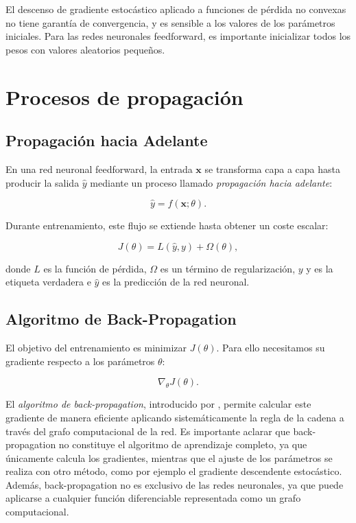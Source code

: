 El descenso de gradiente estocástico aplicado a funciones de pérdida no convexas no tiene garantía de convergencia, y es sensible a los valores de los parámetros iniciales. Para las redes neuronales feedforward, es importante inicializar todos los pesos con valores aleatorios pequeños.


\section{Procesos de propagación}

\subsection{Propagación hacia Adelante}

En una red neuronal feedforward, la entrada $\mathbf{x}$ se transforma capa a capa hasta producir la salida $\hat{y}$ mediante un proceso llamado \emph{propagación hacia adelante}:

\[
\hat{y} = f(\mathbf{x}; \theta).
\]

Durante entrenamiento, este flujo se extiende hasta obtener un coste escalar:

\[
J(\theta) = L(\hat{y}, y) + \Omega(\theta),
\]

donde $L$ es la función de pérdida, $\Omega$ es un término de regularización, $y$ y es la etiqueta verdadera e $\hat{y}$ es la predicción de la red neuronal.

\subsection{Algoritmo de Back-Propagation}

El objetivo del entrenamiento es minimizar $J(\theta)$. Para ello necesitamos su gradiente respecto a los parámetros $\theta$:

\[
\nabla_\theta J(\theta).
\]

El \emph{algoritmo de back-propagation}, introducido por \cite{rumelhart1986learning}, permite calcular este gradiente de manera eficiente aplicando sistemáticamente la regla de la cadena a través del grafo computacional de la red. Es importante aclarar que back-propagation no constituye el algoritmo de aprendizaje completo, ya que únicamente calcula los gradientes, mientras que el ajuste de los parámetros se realiza con otro método, como por ejemplo el gradiente descendente estocástico. Además, back-propagation no es exclusivo de las redes neuronales, ya que puede aplicarse a cualquier función diferenciable representada como un grafo computacional. 

